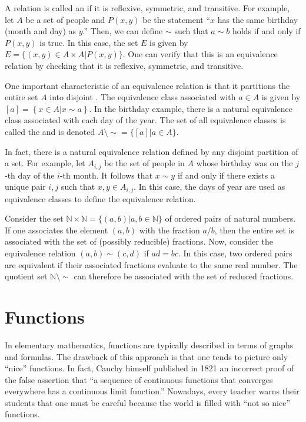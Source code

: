 A relation is called an  if it is reflexive, symmetric, and transitive.
For example, let $A$ be a set of people and $P(x,y)$ be the statement ``$x$ has the same birthday (month and day) as $y$.''
Then, we can define $\sim$ such that $a\sim b$ holds if and only if $P(x,y)$ is true.
In this case, the set $E$ is given by $E = \{ (x,y)\in A\times A | P(x,y) \}$.
One can verify that this is an equivalence relation by checking that it is reflexive, symmetric, and transitive.

One important characteristic of an equivalence relation is that it partitions the entire set $A$ into disjoint .
The equivalence class associated with $a\in A$ is given by  $[a] = \left\{x\in A | x \sim a\right\}$.
In the birthday example, there is a natural equivalence class associated with each day of the year.
The set of all equivalence classes is called the  and is denoted $A \setminus \!\sim = \{ [a] | a\in A \}$.

In fact, there is a natural equivalence relation defined by any disjoint partition of a set.
For example, let $A_{i,j}$ be the set of people in $A$ whose birthday was on the $j$-th day of the $i$-th month.
It follows that $x\sim y$ if and only if there exists a unique pair $i,j$ such that $x,y \in A_{i,j}$.
In this case, the days of year are used as equivalence classes to define the equivalence relation.

\begin{example}
Consider the set $\mathbb{N} \times \mathbb{N} = \{ (a,b) | a,b\in\mathbb{N} \}$ of ordered pairs of natural numbers.
If one associates the element $(a,b)$ with the fraction $a/b$, then the entire set is associated with the set of (possibly reducible) fractions.
Now, consider the equivalence relation $(a,b) \sim (c,d)$ if $ad=bc$.
In this case, two ordered pairs are equivalent if their associated fractions evaluate to the same real number.
The quotient set $\mathbb{N} \setminus \!\sim$ can therefore be associated with the set of reduced fractions.
\end{example}


\section{Functions}

In elementary mathematics, functions are typically described in terms of graphs and formulas.
The drawback of this approach is that one tends to picture only ``nice'' functions.
In fact, Cauchy himself published in 1821 an incorrect proof of the false assertion that ``a sequence of continuous functions that converges everywhere has a continuous limit function.''
Nowadays, every teacher warns their students that one must be careful because the world is filled with ``not so nice'' functions.

